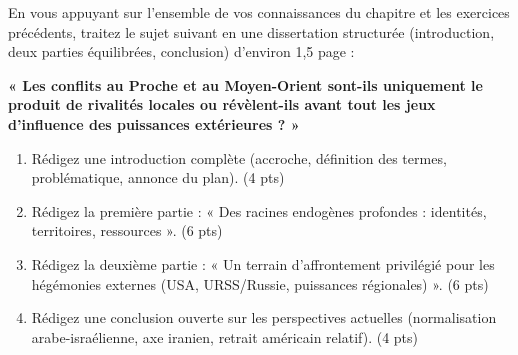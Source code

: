 \documentclass[11pt]{article}
\begin{document}
\begin{exercice}
En vous appuyant sur l'ensemble de vos connaissances du chapitre et les exercices précédents, traitez le sujet suivant en une dissertation structurée (introduction, deux parties équilibrées, conclusion) d'environ 1,5 page :

\textbf{« Les conflits au Proche et au Moyen-Orient sont-ils uniquement le produit de rivalités locales ou révèlent-ils avant tout les jeux d'influence des puissances extérieures ? »}

\begin{enumerate}
    \item Rédigez une introduction complète (accroche, définition des termes, problématique, annonce du plan). (4 pts)
    \item Rédigez la première partie : « Des racines endogènes profondes : identités, territoires, ressources ». (6 pts)
    \item Rédigez la deuxième partie : « Un terrain d'affrontement privilégié pour les hégémonies externes (USA, URSS/Russie, puissances régionales) ». (6 pts)
    \item Rédigez une conclusion ouverte sur les perspectives actuelles (normalisation arabe-israélienne, axe iranien, retrait américain relatif). (4 pts)
\end{enumerate}
\end{exercice}
\end{document}
